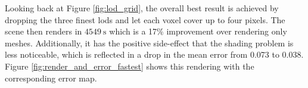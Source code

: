 Looking back at Figure \ref{fig:lod_grid}, the overall best result is achieved by dropping the three finest \acsp{lod} and let each voxel cover up to four pixels.
The scene then renders in $\SI{4549}{\s}$ which is a 17\% improvement over rendering only meshes.
Additionally, it has the positive side-effect that the shading problem is less noticeable, which is reflected in a drop in the mean \FLIP error from 0.073 to 0.038.
Figure \ref{fig:render_and_error_fastest} shows this rendering with the corresponding \FLIP error map.
\begin{figure}[ht]
    \centering
    \begin{subfigure}[b]{\linewidth}
\end{subfigure}
\end{figure}
